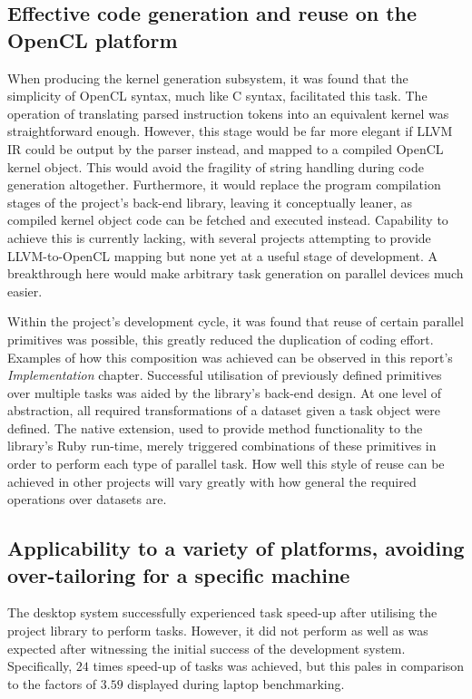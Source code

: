 \subsection{Effective code generation and reuse on the OpenCL platform}
When producing the kernel generation subsystem, it was found that the simplicity of \ac{OpenCL} syntax, much like C syntax, facilitated this task. The operation of translating parsed instruction tokens into an equivalent kernel was straightforward enough. However, this stage would be far more elegant if LLVM \ac{IR} could be output by the parser instead, and mapped to a compiled \ac{OpenCL} kernel object. This would avoid the fragility of string handling during code generation altogether. Furthermore, it would replace the program compilation stages of the project's back-end library, leaving it conceptually leaner, as compiled kernel object code can be fetched and executed instead. Capability to achieve this is currently lacking, with several projects attempting to provide LLVM-to-\ac{OpenCL} mapping but none yet at a useful stage of development. A breakthrough here would make arbitrary task generation on parallel devices much easier.

Within the project's development cycle, it was found that reuse of certain parallel primitives was possible, this greatly reduced the duplication of coding effort. Examples of how this composition was achieved can be observed in this report's \emph{Implementation} chapter. Successful utilisation of previously defined primitives over multiple tasks was aided by the library's back-end design. At one level of abstraction, all required transformations of a dataset given a task object were defined. The native extension, used to provide method functionality to the library's Ruby run-time, merely triggered combinations of these primitives in order to perform each type of parallel task. How well this style of reuse can be achieved in other projects will vary greatly with how general the required operations over datasets are.


\subsection{Applicability to a variety of platforms, avoiding over-tailoring for a specific machine}
The desktop system successfully experienced task speed-up after utilising the project library to perform tasks. However, it did not perform as well as was expected after witnessing the initial success of the development system. Specifically, $2$\textendash$4$ times speed-up of tasks was achieved, but this pales in comparison to the factors of $3.5$\textendash$9$ displayed during laptop benchmarking.

